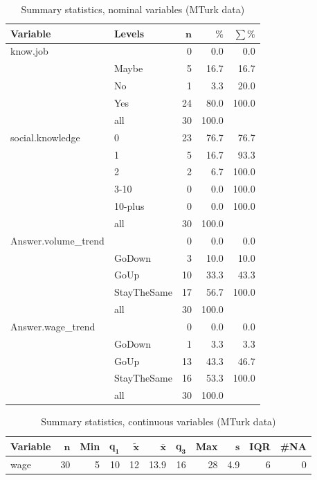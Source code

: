 \documentclass[a4paper,10pt]{article}\usepackage[]{graphicx}\usepackage[]{color}
\begin{document}
\begin{table}[ht]
\centering
{\footnotesize
\begin{tabular}{ll|rrr}
 \textbf{Variable} & \textbf{Levels} & $\mathbf{n}$ & $\mathbf{\%}$ & $\mathbf{\sum \%}$ \\ 
  \hline
know.job &  & 0 & 0.0 & 0.0 \\ 
   & Maybe & 5 & 16.7 & 16.7 \\ 
   & No & 1 & 3.3 & 20.0 \\ 
   & Yes & 24 & 80.0 & 100.0 \\ 
   \hline
 & all & 30 & 100.0 &  \\ 
   \hline
\hline
social.knowledge & 0 & 23 & 76.7 & 76.7 \\ 
   & 1 & 5 & 16.7 & 93.3 \\ 
   & 2 & 2 & 6.7 & 100.0 \\ 
   & 3-10 & 0 & 0.0 & 100.0 \\ 
   & 10-plus & 0 & 0.0 & 100.0 \\ 
   \hline
 & all & 30 & 100.0 &  \\ 
   \hline
\hline
Answer.volume\_trend &  & 0 & 0.0 & 0.0 \\ 
   & GoDown & 3 & 10.0 & 10.0 \\ 
   & GoUp & 10 & 33.3 & 43.3 \\ 
   & StayTheSame & 17 & 56.7 & 100.0 \\ 
   \hline
 & all & 30 & 100.0 &  \\ 
   \hline
\hline
Answer.wage\_trend &  & 0 & 0.0 & 0.0 \\ 
   & GoDown & 1 & 3.3 & 3.3 \\ 
   & GoUp & 13 & 43.3 & 46.7 \\ 
   & StayTheSame & 16 & 53.3 & 100.0 \\ 
   \hline
 & all & 30 & 100.0 &  \\ 
   \hline
\hline
\end{tabular}
}
\caption{Summary statistics, nominal variables (MTurk data)} 
\label{tab1:33-9030}
\end{table}
\begin{table}[ht]
\centering
{\footnotesize
\begin{tabular}{lrrrrrrrrrr}
 \textbf{Variable} & $\mathbf{n}$ & \textbf{Min} & $\mathbf{q_1}$ & $\mathbf{\widetilde{x}}$ & $\mathbf{\bar{x}}$ & $\mathbf{q_3}$ & \textbf{Max} & $\mathbf{s}$ & \textbf{IQR} & \textbf{\#NA} \\ 
  \hline
wage & 30 & 5 & 10 & 12 & 13.9 & 16 & 28 & 4.9 & 6 & 0 \\ 
  \end{tabular}
}
\caption{Summary statistics, continuous variables (MTurk data)} 
\label{tab2:33-9030}
\end{table}
\end{document}
